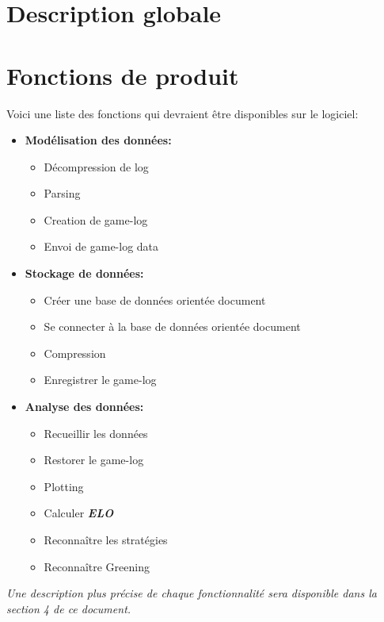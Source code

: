 \documentclass{scrreprt}
\begin{document}
\section{Description globale}


\section{Fonctions de produit}

Voici une liste des fonctions qui devraient être disponibles sur le logiciel:
\begin{itemize}


  \item{\textbf{Modélisation des données:}}
    \begin{itemize}
    \item{Décompression de log}
    \item{Parsing}
    \item{Creation de game-log}
    \item{Envoi de game-log data}
    \end{itemize}
  \item{\textbf{Stockage de données:}}
    \begin{itemize}
    \item{Créer une base de données orientée document}
    \item{Se connecter à la base de données orientée document}
    \item{Compression}
    \item{Enregistrer le game-log}
    \end{itemize}
  \item{\textbf{Analyse des données:}}
    \begin{itemize}
      \item{Recueillir les données}
      \item{Restorer le game-log}
      \item{Plotting}
      \item{Calculer \textit{\textbf{ELO}}}
      \item{Reconnaître les stratégies}
      \item{Reconnaître Greening}
    \end{itemize}
\end{itemize}
\textit{ Une description plus précise de chaque fonctionnalité sera disponible dans la section 4 de ce document. }
\end{document}

